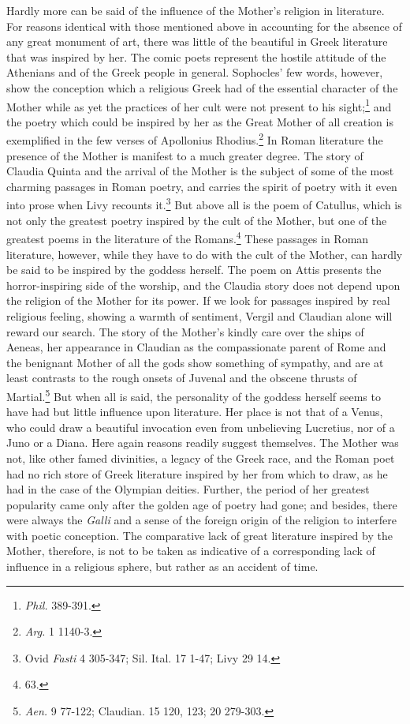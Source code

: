 \documentclass[a4paper, 11pt, oneside, polutonikogreek, french]{article}
\begin{document}
Hardly more can be said of the influence of the Mother's religion in literature. For reasons identical with those mentioned above in accounting for the absence of any great monument of art, there was little of the beautiful in Greek literature that was inspired by her. The comic poets represent the hostile attitude of the Athenians and of the Greek people in general. Sophocles' few words, however, show the conception which a religious Greek had of the essential character of the Mother while as yet the practices of her cult were not present to his sight;\footnote{\emph{Phil.} 389-391.} and the poetry which could be inspired by her as the Great Mother of all creation is exemplified in the few verses of Apollonius Rhodius.\footnote{\emph{Arg.} 1 1140-3.} In Roman literature the presence of the Mother is manifest to a much greater degree. The story of Claudia Quinta and the arrival of the Mother is the subject of some of the most charming passages in Roman poetry, and carries the spirit of poetry with it even into prose when Livy recounts it.\footnote{Ovid \emph{Fasti} 4 305-347; Sil. Ital. 17 1-47; Livy 29 14.} But above all is the poem of Catullus, which is not only the greatest poetry inspired by the cult of the Mother, but one of the greatest poems in the literature of the Romans.\footnote{63.} These passages in Roman literature, however, while they have to do with the cult of the Mother, can hardly be said to be inspired by the goddess herself. The poem on Attis presents the horror-inspiring side of the worship, and the Claudia story does not depend upon the religion of the Mother for its power. If we look for passages inspired by real religious feeling, showing a warmth of sentiment, Vergil and Claudian alone will reward our search. The story of the Mother's kindly care over the ships of Aeneas, her appearance in Claudian as the compassionate parent of Rome and the benignant Mother of all the gods show something of sympathy, and are at least contrasts to the rough onsets of Juvenal and the obscene thrusts of Martial.\footnote{\emph{Aen.} 9 77-122; Claudian. 15 120, 123; 20 279-303.} But when all is said, the personality of the goddess herself seems to have had but little influence upon literature. Her place is not that of a Venus, who could draw a beautiful invocation even from unbelieving Lucretius, nor of a Juno or a Diana. Here again reasons readily suggest themselves. The Mother was not, like other famed divinities, a legacy of the Greek race, and the Roman poet had no rich store of Greek literature inspired by her from which to draw, as he had in the case of the Olympian deities. Further, the period of her greatest popularity came only after the golden age of poetry had gone; and besides, there were always the \emph{Galli} and a sense of the foreign origin of the religion to interfere with poetic conception. The comparative lack of great literature inspired by the Mother, therefore, is not to be taken as indicative of a corresponding lack of influence in a religious sphere, but rather as an accident of time.
\end{document}
